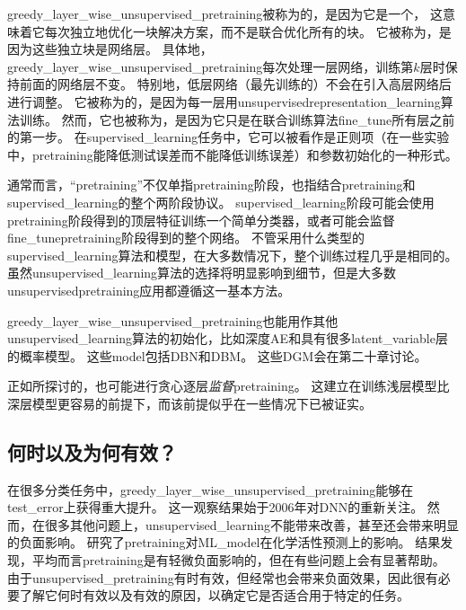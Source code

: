 \gls{greedy_layer_wise_unsupervised_pretraining}被称为的，是因为它是一个，
这意味着它每次独立地优化一块解决方案，而不是联合优化所有的块。
它被称为，是因为这些独立块是网络层。
具体地，\gls{greedy_layer_wise_unsupervised_pretraining}每次处理一层网络，训练第$k$层时保持前面的网络层不变。
特别地，低层网络（最先训练的）不会在引入高层网络后进行调整。
它被称为的，是因为每一层用\gls{unsupervised}\gls{representation_learning}算法训练。
然而，它也被称为，是因为它只是在联合训练算法\gls{fine_tune}所有层之前的第一步。
在\gls{supervised_learning}任务中，它可以被看作是正则项（在一些实验中，\gls{pretraining}能降低测试误差而不能降低训练误差）和参数初始化的一种形式。


通常而言，``\gls{pretraining}''不仅单指\gls{pretraining}阶段，也指结合\gls{pretraining}和\gls{supervised_learning}的整个两阶段协议。
\gls{supervised_learning}阶段可能会使用\gls{pretraining}阶段得到的顶层特征训练一个简单分类器，或者可能会监督\gls{fine_tune}\gls{pretraining}阶段得到的整个网络。
不管采用什么类型的\gls{supervised_learning}算法和模型，在大多数情况下，整个训练过程几乎是相同的。
虽然\gls{unsupervised_learning}算法的选择将明显影响到细节，但是大多数\gls{unsupervised}\gls{pretraining}应用都遵循这一基本方法。


\gls{greedy_layer_wise_unsupervised_pretraining}也能用作其他\gls{unsupervised_learning}算法的初始化，比如深度\gls{AE}\citep{Hinton-Science2006}和具有很多\gls{latent_variable}层的概率模型。
这些\gls{model}包括\gls{DBN}\citep{Hinton06-small}和\gls{DBM}\citep{Salakhutdinov+Hinton-2009-small}。
这些\gls{DGM}会在第二十章讨论。


正如所探讨的，也可能进行贪心逐层\emph{监督}\gls{pretraining}。
这建立在训练浅层模型比深层模型更容易的前提下，而该前提似乎在一些情况下已被证实\citep{Erhan+al-2010-small}。


\subsection{何时以及为何有效？}
\label{sec:when_and_why_does_unsupervised_pretraining_work}
在很多分类任务中，\gls{greedy_layer_wise_unsupervised_pretraining}能够在\gls{test_error}上获得重大提升。
这一观察结果始于2006年对\gls{DNN}的重新关注\citep{Hinton06-small,Bengio-nips-2006,ranzato-07-small}。
然而，在很多其他问题上，\gls{unsupervised_learning}不能带来改善，甚至还会带来明显的负面影响。
\cite{Ma-et-al-2015}研究了\gls{pretraining}对\gls{ML_model}在化学活性预测上的影响。
结果发现，平均而言\gls{pretraining}是有轻微负面影响的，但在有些问题上会有显著帮助。
由于\gls{unsupervised_pretraining}有时有效，但经常也会带来负面效果，因此很有必要了解它何时有效以及有效的原因，以确定它是否适合用于特定的任务。

